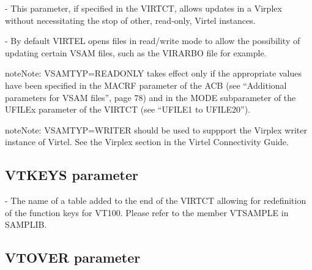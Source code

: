 \documentclass[letterpaper,10pt,english]{sphinxmanual}
\begin{document}
 - This parameter, if specified in the VIRTCT, allows updates in a Virplex without necessitating the stop of other, read-only, Virtel instances.

 - By default VIRTEL opens files in read/write mode to allow the possibility of updating certain VSAM files, such as the VIRARBO file for example.

\begin{sphinxadmonition}{note}{Note:}
VSAMTYP=READONLY takes effect only if the appropriate values have been specified in the MACRF parameter of the ACB (see “Additional parameters for VSAM files”, page 78) and in the MODE subparameter of the UFILEx parameter of the VIRTCT (see “UFILE1 to UFILE20”).
\end{sphinxadmonition}

\begin{sphinxadmonition}{note}{Note:}
VSAMTYP=WRITER should be used to suppport the Virplex writer instance of Virtel. See the Virplex section in the Virtel Connectivity Guide.
\end{sphinxadmonition}

\ignorespaces 

\subsection{VTKEYS parameter}
\label{\detokenize{Installation_Guide:vtkeys-parameter}}\label{\detokenize{Installation_Guide:index-138}}
\begin{sphinxVerbatim}[commandchars=\\\{\}]
 
\end{sphinxVerbatim}

 - The name of a table added to the end of the VIRTCT allowing for redefinition of the function keys for VT100. Please refer to the member VTSAMPLE in SAMPLIB.

\ignorespaces 

\subsection{VTOVER parameter}
\label{\detokenize{Installation_Guide:index-139}}\label{\detokenize{Installation_Guide:id7}}
\begin{sphinxVerbatim}[commandchars=\\\{\}]
 
\end{sphinxVerbatim}
\end{document}
